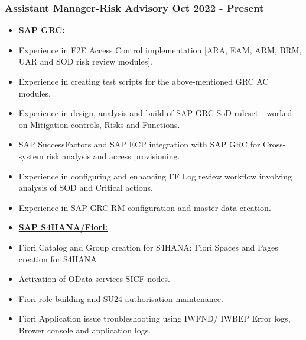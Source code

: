 \documentclass[10pt]{article}
\begin{document}
\subsubsection{Assistant Manager-Risk Advisory \hfill  Oct 2022 - Present \\}
\begin{itemize}
	\small
    	\item[] \textbf{\underline{SAP GRC:}}
			\item Experience in E2E Access Control implementation [ARA, EAM, ARM, BRM, UAR and SOD risk review modules].
			\item Experience in creating test scripts for the above-mentioned GRC AC modules.
			\item Experience in design, analysis and build of SAP GRC SoD ruleset - worked on Mitigation controls, Risks and Functions.
			\item SAP SuccessFactors and SAP ECP integration with SAP GRC for Cross-system risk analysis and access provisioning.
			\item Experience in configuring and enhancing FF Log review workflow involving analysis of SOD and Critical actions.
			\item Experience in SAP GRC RM configuration and master data creation.
\end{itemize}

\begin{itemize}
	\small
    	\item[] \textbf{\underline{SAP S4HANA/Fiori:}}
			\item Fiori Catalog and Group creation for S4HANA; Fiori Spaces and Pages creation for S4HANA
			\item Activation of OData services SICF nodes.
			\item Fiori role building and SU24 authorisation maintenance.
			\item Fiori Application issue troubleshooting using IWFND/ IWBEP Error logs, Brower console and application logs.
\end{itemize}
\end{document}
